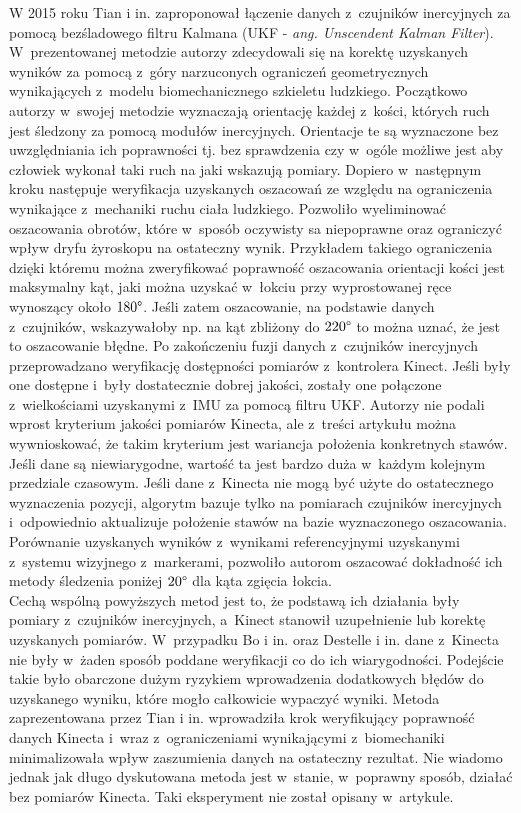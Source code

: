 W 2015 roku Tian i in. \cite{Tian2015a} zaproponował łączenie danych z~czujników inercyjnych za pomocą bezśladowego filtru Kalmana (UKF - \emph{ang. Unscendent Kalman Filter}). W~prezentowanej metodzie autorzy zdecydowali się na korektę uzyskanych wyników za pomocą z~góry narzuconych ograniczeń geometrycznych wynikających z~modelu biomechanicznego szkieletu ludzkiego. Początkowo autorzy w~swojej metodzie wyznaczają orientację każdej z~kości, których ruch jest śledzony za pomocą modułów inercyjnych. Orientacje te są wyznaczone bez uwzględniania ich poprawności tj. bez sprawdzenia czy w~ogóle możliwe jest aby człowiek wykonał taki ruch na jaki wskazują pomiary. Dopiero w~następnym kroku następuje weryfikacja uzyskanych oszacowań ze względu na ograniczenia wynikające z~mechaniki ruchu ciała ludzkiego. Pozwoliło wyeliminować oszacowania obrotów, które w~sposób oczywisty sa niepoprawne oraz ograniczyć wpływ dryfu żyroskopu na ostateczny wynik. Przykładem takiego ograniczenia dzięki któremu można zweryfikować poprawność oszacowania orientacji kości jest maksymalny kąt, jaki można uzyskać w~łokciu przy wyprostowanej ręce wynoszący około $180\degree$. Jeśli zatem oszacowanie, na podstawie danych z~czujników, wskazywałoby np. na kąt zbliżony do $220\degree$ to można uznać, że jest to oszacowanie błędne. Po zakończeniu fuzji danych z~czujników inercyjnych przeprowadzano weryfikację dostępności pomiarów z~kontrolera Kinect. Jeśli były one dostępne i~były dostatecznie dobrej jakości, zostały one połączone z~wielkościami uzyskanymi z~IMU za pomocą filtru UKF. Autorzy nie podali wprost kryterium jakości pomiarów Kinecta, ale z~treści artykułu można wywnioskować, że takim kryterium jest wariancja położenia konkretnych stawów. Jeśli dane są niewiarygodne, wartość ta jest bardzo duża w~każdym kolejnym przedziale czasowym. Jeśli dane z~Kinecta nie mogą być użyte do ostatecznego wyznaczenia pozycji, algorytm bazuje tylko na pomiarach czujników inercyjnych i~odpowiednio aktualizuje położenie stawów na bazie wyznaczonego oszacowania. Porównanie uzyskanych wyników z~wynikami referencyjnymi uzyskanymi z~systemu wizyjnego z~markerami, pozwoliło autorom oszacować dokładność ich metody śledzenia poniżej $20\degree$ dla kąta zgięcia łokcia.\\
		
Cechą wspólną powyższych metod jest to, że podstawą ich działania były pomiary z~czujników inercyjnych, a~Kinect stanowił uzupełnienie lub korektę uzyskanych pomiarów. W~przypadku Bo i in. oraz Destelle i in. dane z~Kinecta nie były w~żaden sposób poddane weryfikacji co do ich wiarygodności. Podejście takie było obarczone dużym ryzykiem wprowadzenia dodatkowych błędów do uzyskanego wyniku, które mogło całkowicie wypaczyć wyniki. Metoda zaprezentowana przez Tian i in. wprowadziła krok weryfikujący poprawność danych Kinecta i~wraz z~ograniczeniami wynikającymi z~biomechaniki minimalizowała wpływ zaszumienia danych na ostateczny rezultat. Nie wiadomo jednak jak długo dyskutowana metoda jest w~stanie, w~poprawny sposób, działać bez pomiarów Kinecta. Taki eksperyment nie został opisany w~artykule.\\\\
		
